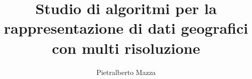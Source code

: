 \documentclass[a4paper,12pt,oneside]{report}
\begin{document}
  
	\title{Studio di algoritmi per la rappresentazione di dati geografici con multi risoluzione}
	\author{Pietralberto Mazza}

	\maketitle
	\salvastmpB
	
	\clearpage{\pagestyle{empty}\cleardoublepage}
	\tableofcontents
	\salvastmpB	
	\newpage	
	\listoffigures		
	\newpage	
	
	
	
	
	
	
	

\end{document}
